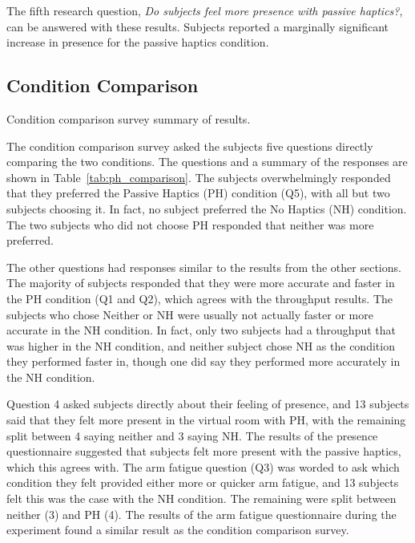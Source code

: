 The fifth research question, \textit{Do subjects feel more presence with passive haptics?}, can be answered with these results.
Subjects reported a marginally significant increase in presence for the passive haptics condition.

\subsection{Condition Comparison}

\begin{table}
    \centering
    \caption{Condition comparison survey summary of results.}
    \label{tab:ph_comparison}
\end{table}

The condition comparison survey asked the subjects five questions directly comparing the two conditions.
The questions and a summary of the responses are shown in Table~\ref{tab:ph_comparison}.
The subjects overwhelmingly responded that they preferred the Passive Haptics (PH) condition (Q5), with all but two subjects choosing it.
In fact, no subject preferred the No Haptics (NH) condition.
The two subjects who did not choose PH responded that neither was more preferred.

The other questions had responses similar to the results from the other sections.
The majority of subjects responded that they were more accurate and faster in the PH condition (Q1 and Q2), which agrees with the throughput results.
The subjects who chose Neither or NH were usually not actually faster or more accurate in the NH condition.
In fact, only two subjects had a throughput that was higher in the NH condition, and neither subject chose NH as the condition they performed faster in, though one did say they performed more accurately in the NH condition.

Question 4 asked subjects directly about their feeling of presence, and 13 subjects said that they felt more present in the virtual room with PH, with the remaining split between 4 saying neither and 3 saying NH.
The results of the presence questionnaire suggested that subjects felt more present with the passive haptics, which this agrees with.
The arm fatigue question (Q3) was worded to ask which condition they felt provided either more or quicker arm fatigue, and 13 subjects felt this was the case with the NH condition.
The remaining were split between neither (3) and PH (4).
The results of the arm fatigue questionnaire during the experiment found a similar result as the condition comparison survey.

